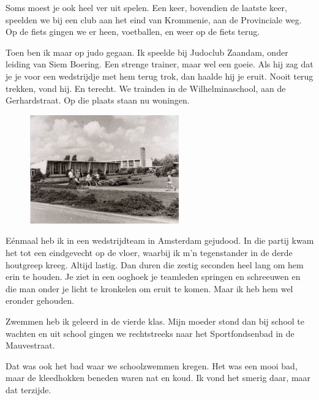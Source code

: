 \documentclass[12pt,twoside]{memoir}
\begin{document}
Soms moest je ook heel ver uit spelen. Een keer, bovendien de laatste keer, speelden we bij een club aan het eind van Krommenie, aan de Provinciale weg. Op de fiets gingen we er heen, voetballen, en weer op de fiets terug. 

Toen ben ik maar op judo gegaan. Ik speelde bij Judoclub Zaandam, onder leiding van Siem Boering. Een strenge trainer, maar wel een goeie. Als hij zag dat je je voor een wedstrijdje met hem terug trok, dan haalde hij je eruit. Nooit terug trekken, vond hij. En terecht. We trainden in de Wilhelminaschool, aan de Gerhardstraat. Op die plaats staan nu woningen.

\begin{figure}
\includegraphics[width=\textwidth]{img/ch11/wilhelminaschool}
\end{figure}

Eénmaal heb ik in een wedstrijdteam in Amsterdam gejudood. In die partij kwam het tot een eindgevecht op de vloer, waarbij ik m’n tegenstander in de derde houtgreep kreeg. Altijd lastig. Dan duren die zestig seconden heel lang om hem erin te houden. Je ziet in een ooghoek je teamleden springen en schreeuwen en die man onder je licht te kronkelen om eruit te komen. Maar ik heb hem wel eronder gehouden. 

Zwemmen heb ik geleerd in de vierde klas. Mijn moeder stond dan bij school te wachten en uit school gingen we rechtstreeks naar het Sportfondsenbad in de Mauvestraat. 

Dat was ook het bad waar we schoolzwemmen kregen. Het was een mooi bad, maar de kleedhokken beneden waren nat en koud. Ik vond het smerig daar, maar dat terzijde. 
\end{document}
